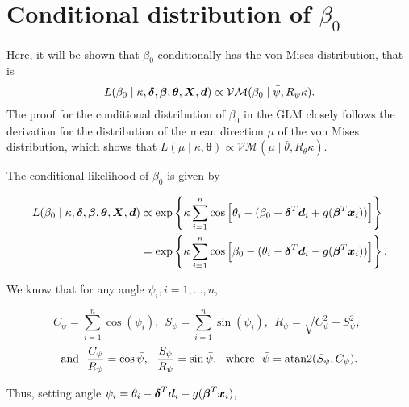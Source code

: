 
\chapter{Conditional distribution of $\beta_0$} \label{beta0}

Here, it will be shown that $\beta_0$ conditionally has the von Mises distribution, that is
\begin{equation}
L(\beta_0 \mid \kappa, \boldsymbol{\delta}, \boldsymbol{\beta}, \boldsymbol{\theta}, \boldsymbol{X}, \boldsymbol{d})  \propto \mathcal{VM}(\beta_0 \mid \bar\psi, R_{\psi}\kappa).
\end{equation} %
The proof for the conditional distribution of $\beta_0$ in the GLM closely follows the derivation for the distribution of the mean direction $\mu$ of the von Mises distribution, which shows that $L(\mu \mid \kappa, \boldsymbol\theta) \propto \mathcal{VM}(\mu \mid \bar\theta, R_{\theta} \kappa)$.

The conditional likelihood of $\beta_0$ is given by

\begin{align*}
L(\beta_0 \mid \kappa, \boldsymbol{\delta}, \boldsymbol{\beta}, \boldsymbol{\theta}, \boldsymbol{X}, \boldsymbol{d}) & \propto \exp \left\lbrace \kappa \sum_{i=1}^n \cos \left[ \theta_i - (\beta_0 + \boldsymbol{\delta}^T \boldsymbol{d}_i +  g(\boldsymbol\beta^T \boldsymbol{x}_i)) \right] \right\rbrace \\
& = \exp \left\lbrace \kappa \sum_{i=1}^n \cos \left[ \beta_0 - (\theta_i - \boldsymbol{\delta}^T \boldsymbol{d}_i - g(\boldsymbol\beta^T \boldsymbol{x}_i)) \right]  \right\rbrace.
\end{align*}

We know that for any angle $\psi_i, i = 1, \dots, n$,

\begin{equation*}
 C_{\psi} = \sum_{i=1}^n \cos(\psi_i), ~~ S_{\psi} = \sum_{i=1}^n \sin(\psi_i), ~~ R_{\psi} = \sqrt{C_{\psi}^2 + S_{\psi}^2}, ~~
\end{equation*}
\begin{equation*}
 \text{and} ~~ \frac{C_{\psi}}{R_{\psi}} = \cos \bar\psi, ~~ \frac{S_{\psi}}{R_{\psi}} = \sin \bar\psi, ~~ \text{where} ~~ \bar\psi = \operatorname{atan2}(S_{\psi}, C_{\psi}).
\end{equation*}

Thus, setting angle $\psi_i = \theta_i - \boldsymbol{\delta}^T \boldsymbol{d}_i - g(\boldsymbol\beta^T \boldsymbol{x}_i)$,


